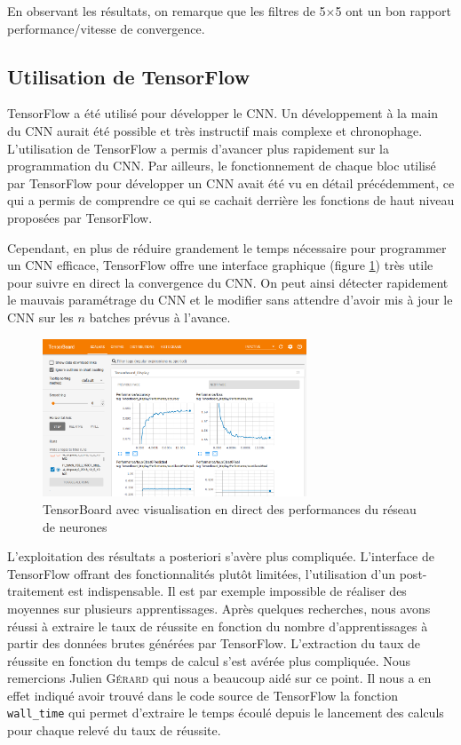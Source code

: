 En observant les résultats, on remarque que les filtres de 5$\times$5 ont un bon rapport performance/vitesse de convergence.


\subsection{Utilisation de TensorFlow}

TensorFlow a été utilisé pour développer le CNN. Un développement à la main du CNN aurait été possible et très instructif mais complexe et chronophage. L'utilisation de TensorFlow a permis d'avancer plus rapidement sur la programmation du CNN. Par ailleurs, le fonctionnement de chaque bloc utilisé par TensorFlow pour développer un CNN avait été vu en détail précédemment, ce qui a permis de comprendre ce qui se cachait derrière les fonctions de haut niveau proposées par TensorFlow.

Cependant, en plus de réduire grandement le temps nécessaire pour programmer un CNN efficace, TensorFlow offre une interface graphique (figure \ref{fig:interface_TF}) très utile pour suivre en direct la convergence du CNN. On peut ainsi détecter rapidement le mauvais paramétrage du CNN et le modifier sans attendre d'avoir mis à jour le CNN sur les $n$ batches prévus à l'avance.

\begin{figure}[ht]
 \centering
 \includegraphics[width=0.7\textwidth]{img/interface_TF.png}
 \caption{TensorBoard avec visualisation en direct des performances du réseau de neurones}
 \label{fig:interface_TF}
\end{figure}


L'exploitation des résultats a posteriori s'avère plus compliquée. L'interface de TensorFlow offrant des fonctionnalités plutôt limitées, l'utilisation d'un post-traitement est indispensable. Il est par exemple impossible de réaliser des moyennes sur plusieurs apprentissages. Après quelques recherches, nous avons réussi à extraire le taux de réussite en fonction du nombre d'apprentissages à partir des données brutes générées par TensorFlow. L'extraction du taux de réussite en fonction du temps de calcul s'est avérée plus compliquée. Nous remercions Julien \textsc{Gérard} qui nous a beaucoup aidé sur ce point. Il nous a en effet indiqué avoir trouvé dans le code source de TensorFlow la fonction \verb|wall_time| qui permet d'extraire le temps écoulé depuis le lancement des calculs pour chaque relevé du taux de réussite.

